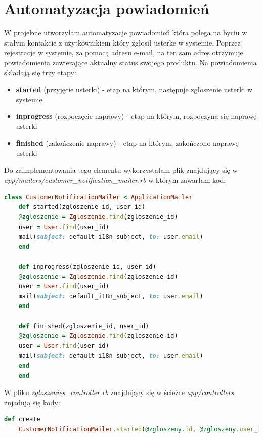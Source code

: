 \documentclass[openright]{xmgr}
\begin{document}
	\section{Automatyzacja powiadomień}
	
	W projekcie utworzyłam automatyzacje powiadomień która polega na byciu w stałym kontakcie z użytkownikiem który zgłosił usterke w systemie. Poprzez rejestracje w systemie, za pomocą adresu e-mail, na ten sam adres otrzymuje powiadomienia zawierające aktualny status swojego produktu. Na powiadomienia składają się trzy etapy:
	
	\begin{itemize}
		\item
		\textbf{started} (przyjęcie usterki) - etap na którym, następuje zgłoszenie usterki w systemie
		
		\item
		\textbf{inprogress} (rozpoczęcie naprawy) - etap na którym, rozpoczyna się naprawę usterki
		
		\item
		\textbf{finished} (zakończenie naprawy) - etap na którym, zakończono naprawę usterki
	\end{itemize}
	
	Do zaimplementowania tego elementu wykorzystałam plik znajdujący się w \textit{app/mailers/customer\_notification\_mailer.rb} w którym zawarłam kod:
	
	\begin{lstlisting}[language=Ruby,lineskip={-1pt},caption=Opis statusów w modelu]
	class CustomerNotificationMailer < ApplicationMailer
	def started(zgloszenie_id, user_id)
	@zgloszenie = Zgloszenie.find(zgloszenie_id)
	user = User.find(user_id)
	mail(subject: default_i18n_subject, to: user.email) 
	end
	
	def inprogress(zgloszenie_id, user_id)
	@zgloszenie = Zgloszenie.find(zgloszenie_id)
	user = User.find(user_id)
	mail(subject: default_i18n_subject, to: user.email) 
	end
	
	def finished(zgloszenie_id, user_id)
	@zgloszenie = Zgloszenie.find(zgloszenie_id)
	user = User.find(user_id)
	mail(subject: default_i18n_subject, to: user.email) 
	end
	end
	\end{lstlisting} 
	
	W pliku \textit{zgłoszenies\_controller.rb} znajdujący się w ścieżce
	\textit{app/controllers} znjadują się kody:
	
	\begin{lstlisting}[language=Ruby,lineskip={-1pt},caption=Powiadomienia o przyjęciu usterki do naprawy]
	def create
	CustomerNotificationMailer.started(@zgloszeny.id, @zgloszeny.user_id).deliver_later
	\end{lstlisting}
	
\end{document}
